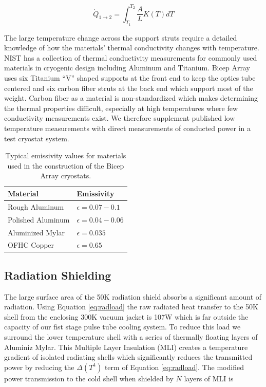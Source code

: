 \documentclass[12pt]{article}
\begin{document}
\begin{equation}
	\dot{Q}_{1\rightarrow 2}=\int _{T_1} ^{T_2} \frac{A}{L}K(T)dT
	\label{eq:conduction}
\end{equation}



The large temperature change across the support struts require a detailed
knowledge of how the materials' thermal conductivity changes with temperature.
NIST has a collection of thermal conductivity measurements for commonly used
materials in cryogenic design including Aluminum and Titanium. Bicep Array
uses six Titanium ``V'' shaped supports at the front end to keep the optics tube
centered and six carbon fiber struts at the back end which support most of the
weight. Carbon fiber as a material is non-standardized which makes determining
the thermal properties difficult, especially at high temperatures where few
conductivity measurements exist. We therefore supplement published low
temperature measurements with direct measurements of conducted power in a test
cryostat system.
\begin{table}
	\center
\begin{tabular}{|l|l|}
	\hline
	\textbf{Material} & \textbf{Emissivity} \\
	\hline \hline
	Rough Aluminum & $\epsilon = 0.07-0.1$ \\
	Polished Aluminum & $\epsilon = 0.04 - 0.06$ \\
	Aluminized Mylar & $\epsilon = 0.035$ \\
	OFHC Copper & $\epsilon = 0.65$ \\ \hline
\end{tabular}
	\caption{Typical emissivity values for materials used in the construction
	of the Bicep Array cryostats.}
	\label{table:emis}
\end{table}



\subsection{Radiation Shielding}
The large surface area of the 50K radiation shield absorbs a significant
amount of radiation. Using Equation \ref{eq:radload} the raw radiated heat
transfer to the 50K shell from the enclosing 300K vacuum jacket is 107W which
is far outside the capacity of our fist stage pulse tube cooling system. To
reduce this load we surround the lower temperature shell with a series of
thermally floating layers of Aluminiz Mylar. This Multiple Layer Insulation
(MLI) creates a temperature gradient of isolated radiating shells which
significantly reduces the transmitted power by reducing the $\Delta (T^4)$
term of Equation \ref{eq:radload}. The modified power transmission to the cold
shell when shielded by $N$ layers of MLI is
\end{document}
